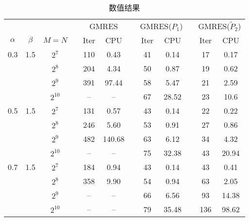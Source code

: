 \documentclass{ecnumaster}
\begin{document}
 
\begin{table}[H]
\centering
\caption{数值结果} \label{tab4-2-2}
\begin{tabular}{cccccccccccc} \toprule
& &  && \multicolumn{2}{c}{GMRES} && \multicolumn{2}{c}{GMRES($P_1$)}
&& \multicolumn{2}{c}{GMRES($\tilde{P}_2$)} \\
$\alpha$ & $\beta$ & $M = N$ && Iter & CPU && Iter & CPU && Iter & CPU\\ \midrule
0.3 & 1.5
 & $2^7$    && 110 & 0.43   && 41 &0.14   && 17 & 0.17\\
&& $2^8$    && 204 & 4.34   && 50 &0.87   && 19 & 0.62\\
&& $2^9$    && 391 & 97.44  && 58 &5.47   && 21 & 2.59\\
&& $2^{10}$ && --  & --     && 67 &28.52  && 23 & 10.6\\  \midrule
0.5 & 1.5
 & $2^7$    && 131 & 0.57   && 43 &0.14   && 22 & 0.22\\
&& $2^8$    && 246 & 5.60   && 53 &0.91   && 27 & 0.86 \\
&& $2^9$    && 482 & 140.68 && 63 &6.12   && 34 & 4.32 \\
&& $2^{10}$ && --  & --     && 75 &32.38  && 43 & 20.94 \\ \midrule
0.7 & 1.5
 & $2^7$    && 184 & 0.94   && 43 &0.14   && 43 & 0.41 \\
&& $2^8$    && 358 & 9.90   && 54 &0.94   && 63 & 2.05 \\
&& $2^9$    && --  & --     && 66 &6.56   && 93 & 14.38 \\
&& $2^{10}$ && --  & --     && 79 &35.48  && 136 & 98.62 \\ \bottomrule
\end{tabular}
\end{table}
\end{document}
